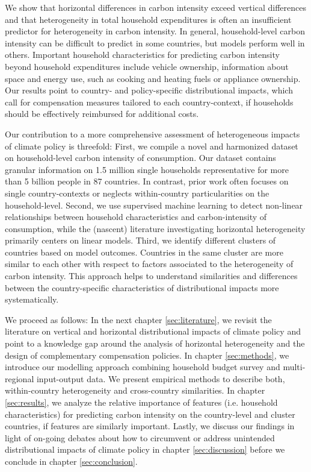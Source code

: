 \documentclass[12pt, a4paper]{article}
\begin{document}
We show that horizontal differences in carbon intensity exceed vertical differences and that heterogeneity in total household expenditures is often an insufficient predictor for heterogeneity in carbon intensity. In general, household-level carbon intensity can be difficult to predict in some countries, but models perform well in others. Important household characteristics for predicting carbon intensity beyond household expenditures include vehicle ownership, information about space and energy use, such as cooking and heating fuels or appliance ownership. Our results point to country- and policy-specific distributional impacts, which call for compensation measures tailored to each country-context, if households should be effectively reimbursed for additional costs. 

Our contribution to a more comprehensive assessment of heterogeneous impacts of climate policy is threefold: First, we compile a novel and harmonized dataset on household-level carbon intensity of consumption. Our dataset contains granular information on 1.5 million single households representative for more than 5 billion people in 87 countries. In contrast, prior work often focuses on single country-contexts or neglects within-country particularities on the household-level. Second, we use supervised machine learning to detect non-linear relationships between household characteristics and carbon-intensity of consumption, while the (nascent) literature investigating horizontal heterogeneity primarily centers on linear models. Third, we identify different clusters of countries based on model outcomes. Countries in the same cluster are more similar to each other with respect to factors associated to the heterogeneity of carbon intensity. This approach helps to understand similarities and differences between the country-specific characteristics of distributional impacts more systematically. %

We proceed as follows: In the next chapter \ref{sec:literature}, we revisit the literature on vertical and horizontal distributional impacts of climate policy and point to a knowledge gap around the analysis of horizontal heterogeneity and the design of complementary compensation policies. In chapter \ref{sec:methods}, we introduce our modelling approach combining household budget survey and multi-regional input-output data. We present empirical methods to describe both, within-country heterogeneity and cross-country similarities. In chapter \ref{sec:results}, we analyze the relative importance of features (i.e. household characteristics) for predicting carbon intensity on the country-level and cluster countries, if features are similarly important. Lastly, we discuss our findings in light of on-going debates about how to circumvent or address unintended distributional impacts of climate policy in chapter \ref{sec:discussion} before we conclude in chapter \ref{sec:conclusion}.  
\end{document}
